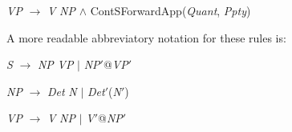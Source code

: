 \textit{VP} $\longrightarrow$ \textit{V} \textit{NP} \d{\d{$\wedge$}}
ContSForwardApp(\textit{Quant}, \textit{Ppty})

A more readable abbreviatory notation for these rules is:

\textit{S} $\longrightarrow$ \textit{NP} \textit{VP} $\mid$
\textit{NP}$'$@\textit{VP}$'$

\textit{NP} $\longrightarrow$ \textit{Det} \textit{N} $\mid$
\textit{Det}$'$(\textit{N}$'$)

\textit{VP} $\longrightarrow$ \textit{V} \textit{NP} $\mid$
\textit{V}$'$@\textit{NP}$'$

